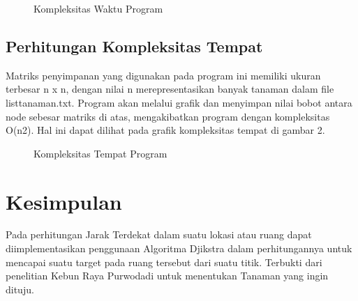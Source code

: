 \documentclass[conference]{IEEEtran}
\begin{document}
\begin{figure}[htbp]
	\centering
	\scalebox{0.17}{}
	\caption{Kompleksitas Waktu Program}
\end{figure}

\subsection{Perhitungan Kompleksitas Tempat}
Matriks penyimpanan yang digunakan pada program ini memiliki ukuran terbesar n x n, dengan nilai n merepresentasikan banyak tanaman dalam file listtanaman.txt. Program akan melalui grafik dan menyimpan nilai bobot antara node sebesar matriks di atas, mengakibatkan program dengan kompleksitas O(n2). Hal ini dapat dilihat pada grafik kompleksitas tempat di gambar 2.

\begin{figure}[htbp]
	\centering
	\scalebox{0.17}{}
	\caption{Kompleksitas Tempat Program}
\end{figure}

\section{Kesimpulan}
Pada perhitungan Jarak Terdekat dalam suatu lokasi atau ruang dapat diimplementasikan penggunaan Algoritma Djikstra dalam perhitungannya untuk mencapai suatu target pada ruang tersebut dari suatu titik. Terbukti dari penelitian Kebun Raya Purwodadi untuk menentukan Tanaman yang ingin dituju.



\end{document}

